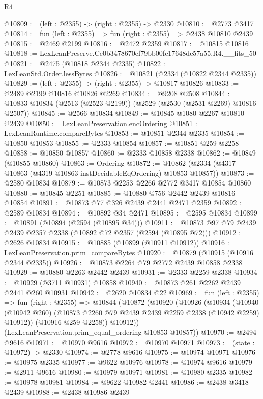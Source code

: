 \begin{lexlean}{R4}
\begin{coremodule}
@10809 := (left : @2355) -> (right : @2355) -> @2330
@10810 := @2773 @3417
@10814 := fun (left : @2355) => fun (right : @2355) => @2438 @10810 @2439
@10815 := @2469 @2199
@10816 := @2472 @2359
@10817 := @10815 @10816
@10818 := LexLeanPreserve.Ce0b3478670ef79bb00fc17648de57a55.R4.__fits_50
@10821 := @2475 (@10818 @2344 @2335)
@10822 := LexLeanStd.Order.lessBytes
@10826 := @10821 (@2334 (@10822 @2344 @2335))
@10829 := (left : @2355) -> (right : @2355) -> @10817 @10826
@10833 := @2489 @2199 @10816 @10826 @2269
@10834 := @9208 @2508
@10844 := @10833 @10834 (@2513 (@2523 @2199)) (@2529 (@2530 (@2531 @2269) @10816 @2507))
@10845 := @2566 @10834
@10849 := @10845 @1080 @2267 @10810 @2439
@10850 := LexLeanPreservation.encOrdering
@10851 := LexLeanRuntime.compareBytes
@10853 := @10851 @2344 @2335
@10854 := @10850 @10853
@10855 := @2333 @10854
@10857 := @10851 @259 @2258
@10858 := @10850 @10857
@10860 := @2333 @10858 @2338
@10862 := @10849 (@10855 @10860)
@10863 := Ordering
@10872 := @10862 (@2334 (@4317 @10863 (@4319 @10863 instDecidableEqOrdering) @10853 @10857))
@10873 := @2580 @10834
@10879 := @10873 @2253 @2266 @2772 @3417 @10854 @10860
@10880 := @10845 @2251
@10885 := @10880 @756 @2442 @2439 @10816 @10854
@10891 := @10873 @77 @326 @2439 @2441 @2471 @2359
@10892 := @2589 @10834
@10894 := @10892 @34 @2471
@10895 := @2595 @10834
@10899 := @10891 (@10894 (@2594 (@10895 @34)))
@10911 := @10873 @97 @79 @2439 @2439 @2357 @2338 (@10892 @72 @2357 (@2594 (@10895 @72)))
@10912 := @2626 @10834
@10915 := @10885 (@10899 (@10911 @10912))
@10916 := LexLeanPreservation.prim_compareBytes
@10920 := @10879 (@10915 (@10916 @2344 @2335))
@10926 := @10873 @2264 @79 @2772 @2439 @10858 @2338
@10929 := @10880 @2263 @2442 @2439
@10931 := @2333 @2259 @2338
@10934 := @10929 (@3711 @10931) @10858
@10940 := @10873 @261 @2262 @2439 @2441 @260 @10931
@10942 := @2620 @10834 @22
@10969 := fun (left : @2355) =>
  fun (right : @2355) =>
  @10844
    (@10872
      (@10920
        (@10926
          (@10934
            (@10940 (@10942 @260) (@10873 @2260 @79 @2439 @2439 @2259 @2338 (@10942 @2259) @10912))
            (@10916 @259 @2258))
          @10912))
      (LexLeanPreservation.prim_equal_ordering @10853 @10857))
@10970 := @2494 @9616
@10971 := @10970 @9616
@10972 := @10970 @10971
@10973 := (state : @10972) -> @2330
@10974 := @2778 @9616
@10975 := @10974 @10971
@10976 := @10975 @2335
@10977 := @9622 @10976
@10978 := @10974 @9616
@10979 := @2911 @9616
@10980 := @10979 @10971
@10981 := @10980 @2335
@10982 := @10978 @10981
@10984 := @9622 @10982 @2441
@10986 := @2438 @3418 @2439
@10988 := @2438 @10986 @2439

\end{coremodule}
\end{lexlean}
